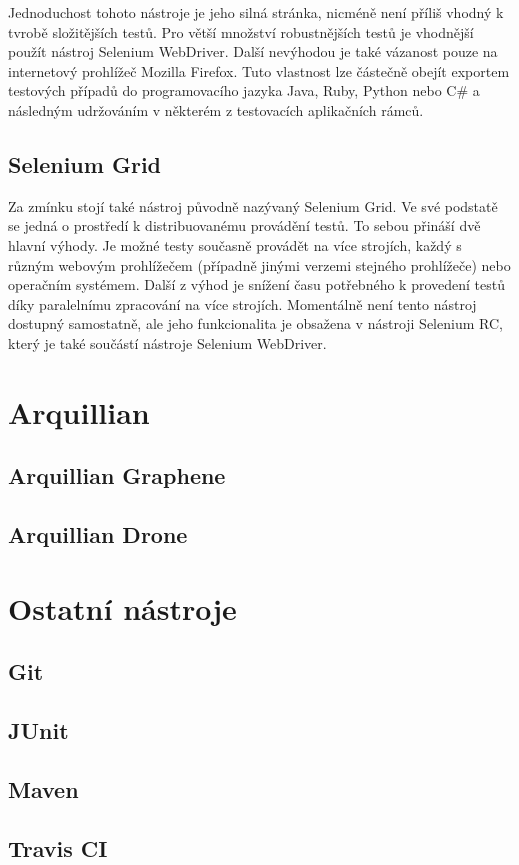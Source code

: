 \documentclass[
    color,   %
	table,   %
    twoside, %
]{fithesis3}
\begin{document}
Jednoduchost tohoto nástroje je jeho silná stránka, nicméně není příliš vhodný k tvrobě složitějších testů. Pro větší množství robustnějších testů je vhodnější použít nástroj Selenium WebDriver. Další nevýhodou je také vázanost pouze na internetový prohlížeč Mozilla Firefox. Tuto vlastnost lze částečně obejít exportem testových případů do programovacího jazyka Java, Ruby, Python nebo C\# a následným udržováním v některém z testovacích aplikačních rámců.

\subsection{Selenium Grid}
Za zmínku stojí také nástroj původně nazývaný Selenium Grid. Ve své podstatě se jedná o prostředí k distribuovanému provádění testů. To sebou přináší dvě hlavní výhody. Je možné testy současně provádět na více strojích, každý s různým webovým prohlížečem (případně jinými verzemi stejného prohlížeče) nebo operačním systémem. Další z výhod je snížení času potřebného k provedení testů díky paralelnímu zpracování na více strojích. Momentálně není tento nástroj dostupný samostatně, ale jeho funkcionalita je obsažena v nástroji Selenium RC, který je také součástí nástroje Selenium WebDriver\cite{Selenium}.
\section{Arquillian}
\subsection{Arquillian Graphene}
\subsection{Arquillian Drone}
\section{Ostatní nástroje}
\subsection{Git}
\subsection{JUnit}
\subsection{Maven}
\subsection{Travis CI}
\end{document}
